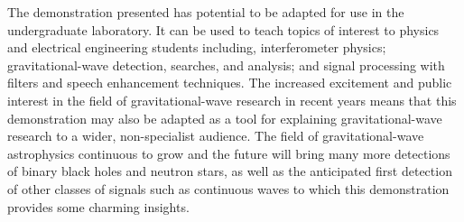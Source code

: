 \documentclass[paper-main.tex]{subfiles}
\begin{document}
The demonstration presented has potential to be adapted for use in the undergraduate laboratory.
It can be used to teach topics of interest to physics and electrical engineering students including, interferometer physics; gravitational-wave detection, searches, and analysis; and signal processing with filters and speech enhancement techniques. 
The increased excitement and public interest in the field of gravitational-wave research in recent years means that this demonstration may also be adapted as a tool for explaining gravitational-wave research to a wider, non-specialist audience. 
The field of gravitational-wave astrophysics continuous to grow and the future will bring many more detections of binary black holes and neutron stars, as well as the anticipated first detection of other classes of signals such as continuous waves to which this demonstration provides some charming insights. 




\end{document}
